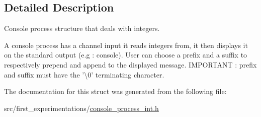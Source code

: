 \subsection{Detailed Description}
Console process structure that deals with integers. 

A console process has a channel input it reads integers from, it then displays it on the standard output (e.\-g \-: console). User can choose a prefix and a suffix to respectively prepend and append to the displayed message. I\-M\-P\-O\-R\-T\-A\-N\-T \-: prefix and suffix must have the '\textbackslash{}0' terminating character. 

The documentation for this struct was generated from the following file\-:\begin{DoxyCompactItemize}
\item 
src/first\-\_\-experimentations/\hyperlink{console__process__int_8h}{console\-\_\-process\-\_\-int.\-h}\end{DoxyCompactItemize}
